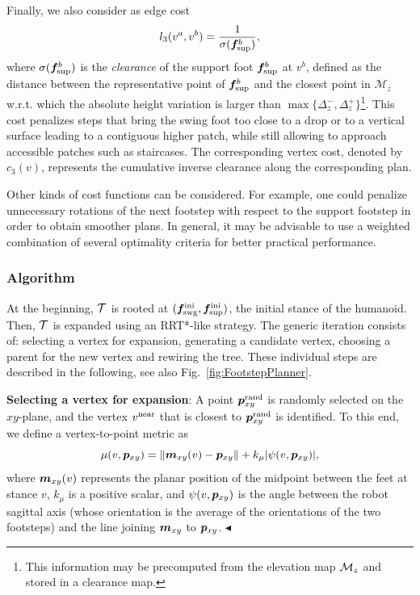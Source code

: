 Finally, we  also consider as edge cost
\begin{equation}
l_3(v^a, v^b) = \frac{1}{\sigma ({\bm{f}}^b_{\rm sup})},
\label{eq:costClearance}
\end{equation}
where $\sigma ({\bm{f}}^b_{\rm sup})$ is the {\em clearance} of the support foot ${\bm{f}}^b_{\rm sup}$ at $v^b$, defined as the distance between the representative point of ${\bm{f}}^b_{\rm sup}$ and the closest point in $\mathcal{M}_z$
w.r.t. which the absolute height variation is larger than $\max\{\Delta_z^-, \Delta_z^+\}$\footnote{This information may be precomputed from the elevation map ${\cal M}_z$ and stored in a clearance map.}.
This cost penalizes steps that bring the swing foot too close to a drop or to a vertical surface leading to a contiguous higher patch,
while still allowing to approach accessible patches such as staircases.
The corresponding vertex cost, denoted by $c_3(v)$, represents the cumulative inverse clearance along the corresponding plan.

Other kinds of cost functions can be considered. For example, one could penalize unnecessary rotations of the next footstep with respect to the support footstep in order to obtain smoother plans.  
In general, it may be advisable to use a weighted combination of several optimality criteria for better practical performance. 

\medskip

\subsubsection{Algorithm}
\label{sec:offlineCase:FP:PlannerOverview}

At the beginning, $\cal T$ is rooted at $({\bm{f}}_{\rm swg}^{\rm ini}, {\bm{f}}_{\rm sup}^{\rm ini})$, the initial stance of the humanoid.
Then, $\cal T$ is expanded using an RRT*-like strategy. The generic iteration consists of: selecting a vertex for expansion, generating a candidate vertex, choosing a parent for the new vertex and rewiring the tree. These individual steps are described in the following, see also Fig.~\ref{fig:FootstepPlanner}.

{\bf Selecting a vertex for expansion}: A point ${\bm{p}}_{xy}^{\rm rand}$ is randomly selected on the $xy$-plane, and
the vertex $v^{\rm near}$ that is closest to ${\bm{p}}_{xy}^{\rm rand}$ is identified. To this end, we define a vertex-to-point metric as
\begin{equation*}
\mu(v, {\bm{p}}_{xy}) = \lVert {\bm{m}}_{xy}(v) - {\bm{p}}_{xy} \rVert + k_{\mu} |\psi(v,{\bm{p}}_{xy})|,
\end{equation*}
where ${\bm{m}}_{xy}(v)$ represents the planar position of the midpoint between the feet at stance $v$, $k_{\mu}$ is a positive scalar, and $\psi(v,{\bm{p}}_{xy})$ is the angle between the robot sagittal axis (whose orientation is the average of the orientations of the two footsteps) and the line joining ${\bm{m}}_{xy}$ to ${\bm{p}}_{xy}$. 
\hfill $\blacktriangleleft$

